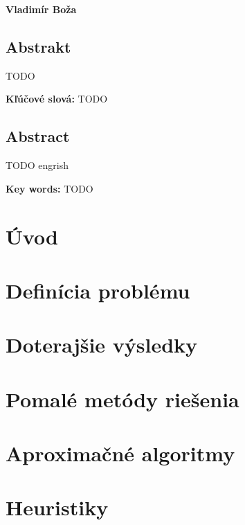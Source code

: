\documentclass[12pt,a4paper]{book}
\begin{document}
\hfill{\bf Vladimír Boža}
\eject %


\thispagestyle{empty}

\section*{Abstrakt}

TODO

\medskip
{\bf Kľúčové slová:} TODO
\eject

\thispagestyle{empty}

\section*{Abstract}

TODO engrish

\medskip
{\bf Key words:} TODO
\eject

\thispagestyle{empty}
\tableofcontents
\thispagestyle{empty}

\setcounter{page}{0}
\chapter*{Úvod}
\label{chapter:uvod}


\chapter{Definícia problému}
\label{chapter:definition}


\chapter{Doterajšie výsledky}
\label{chapter:previous}


\chapter{Pomalé metódy riešenia}
\label{chapter:slow}


\chapter{Aproximačné algoritmy}
\label{chapter:ptas}


\chapter{Heuristiky}
\label{chapter:heuristiky}

\end{document}

